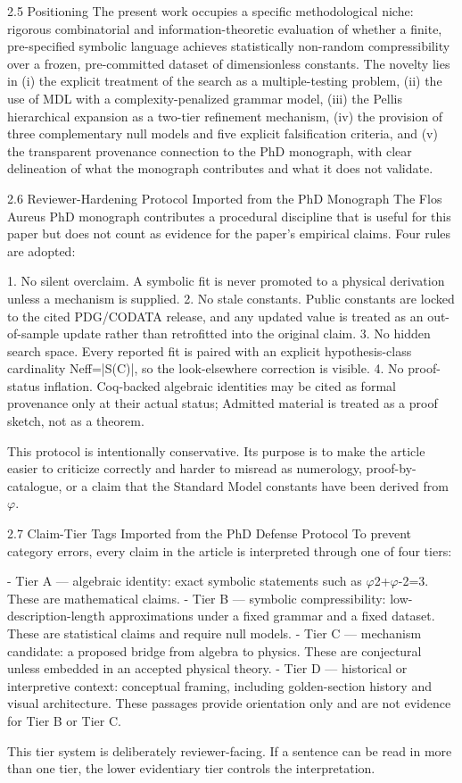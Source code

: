   2.5 Positioning
  The present work occupies a specific methodological niche: rigorous combinatorial and
  information-theoretic evaluation of whether a finite, pre-specified symbolic language
  achieves statistically non-random compressibility over a frozen, pre-committed dataset
  of dimensionless constants. The novelty lies in (i) the explicit treatment of the search as
  a multiple-testing problem, (ii) the use of MDL with a complexity-penalized grammar
  model, (iii) the Pellis hierarchical expansion as a two-tier refinement mechanism, (iv)
  the provision of three complementary null models and five explicit falsification criteria,
  and (v) the transparent provenance connection to the PhD monograph, with clear
  delineation of what the monograph contributes and what it does not validate.

  2.6 Reviewer-Hardening Protocol Imported from the PhD Monograph
  The Flos Aureus PhD monograph contributes a procedural discipline that is useful for
  this paper but does not count as evidence for the paper's empirical claims. Four rules
  are adopted:

  1. No silent overclaim. A symbolic fit is never promoted to a physical derivation unless a
  mechanism is supplied.
  2. No stale constants. Public constants are locked to the cited PDG/CODATA release,
  and any updated value is treated as an out-of-sample update rather than retrofitted into
  the original claim.
  3. No hidden search space. Every reported fit is paired with an explicit hypothesis-class
  cardinality Neff=|S(C)|, so the look-elsewhere correction is visible.
  4. No proof-status inflation. Coq-backed algebraic identities may be cited as formal
  provenance only at their actual status; Admitted material is treated as a proof sketch,
  not as a theorem.

  This protocol is intentionally conservative. Its purpose is to make the article easier to
  criticize correctly and harder to misread as numerology, proof-by-catalogue, or a claim
  that the Standard Model constants have been derived from $\varphi$.

  2.7 Claim-Tier Tags Imported from the PhD Defense Protocol
  To prevent category errors, every claim in the article is interpreted through one of four
  tiers:

  - Tier A --- algebraic identity: exact symbolic statements such as $\varphi$2+$\varphi$-2=3. These are
  mathematical claims.
  - Tier B --- symbolic compressibility: low-description-length approximations under a
  fixed grammar and a fixed dataset. These are statistical claims and require null models.
  - Tier C --- mechanism candidate: a proposed bridge from algebra to physics. These are
  conjectural unless embedded in an accepted physical theory.
  - Tier D --- historical or interpretive context: conceptual framing, including
  golden-section history and visual architecture. These passages provide orientation only
  and are not evidence for Tier B or Tier C.

  This tier system is deliberately reviewer-facing. If a sentence can be read in more than
  one tier, the lower evidentiary tier controls the interpretation.

